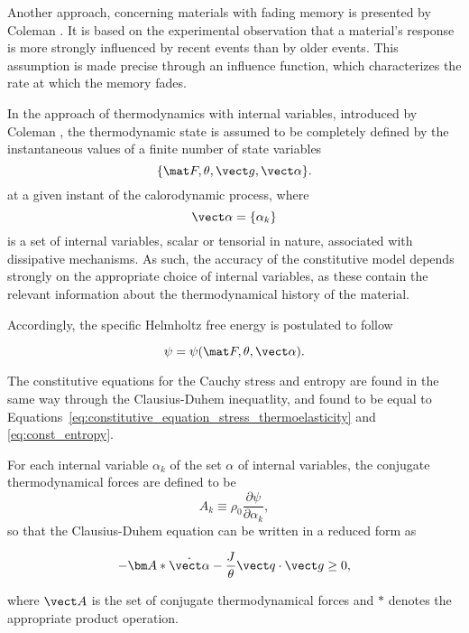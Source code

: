 Another approach, concerning materials with fading memory is presented by Coleman \citep{colemanFoundationsLinearViscoelasticity1961, colemanThermodynamicsStrainImpulses1964, colemanThermodynamicsMaterialsMemory1964}.
It is based on the experimental observation that a material's response is more strongly influenced by recent events than by older events.
This assumption is made precise through an influence function, which characterizes the rate at which the memory fades.

In the approach of thermodynamics with internal variables, introduced by Coleman \citep{colemanThermodynamicsInternalState1967},
the thermodynamic state is assumed to be completely defined by the instantaneous values of a finite number of state variables
\begin{equation}
    \{\mat F, \theta, \vect g, \vect \alpha\}.
\end{equation}
at a given instant of the calorodynamic process, where
\begin{equation}
    \vect \alpha = \{\alpha_k\}
\end{equation}
is a set of internal variables, scalar or tensorial in nature, associated with dissipative mechanisms.
As such, the accuracy of the constitutive model depends strongly on the appropriate choice of internal variables, as these contain the relevant information about the thermodynamical history of the material.

Accordingly, the specific Helmholtz free energy is postulated to follow
\begin{highlight}
    \begin{equation}
        \psi = \psi(\mat F, \theta, \vect \alpha).
    \end{equation}
\end{highlight}
The constitutive equations for the Cauchy stress and entropy are found in the same way through the Clausius-Duhem inequatlity, and found to be equal to Equations~\eqref{eq:constitutive_equation_stress_thermoelasticity} and \eqref{eq:const_entropy}.

For each internal variable $\alpha_k$ of the set $\alpha$ of internal variables, the conjugate thermodynamical forces are defined to be
\begin{equation}
    A_k\equiv \rho_0 \frac{\partial \psi}{\partial \alpha_k},
\end{equation}
so that the Clausius-Duhem equation can be written in a reduced form as
\begin{highlight}
    \begin{equation}
        -\bm A*\dot{\vect \alpha} - \frac{J}{\theta}\vect q\cdot \vect g\geq 0,
    \end{equation}
\end{highlight}
where $\vect A$ is the set of conjugate thermodynamical forces and \(*\) denotes the appropriate product operation.

